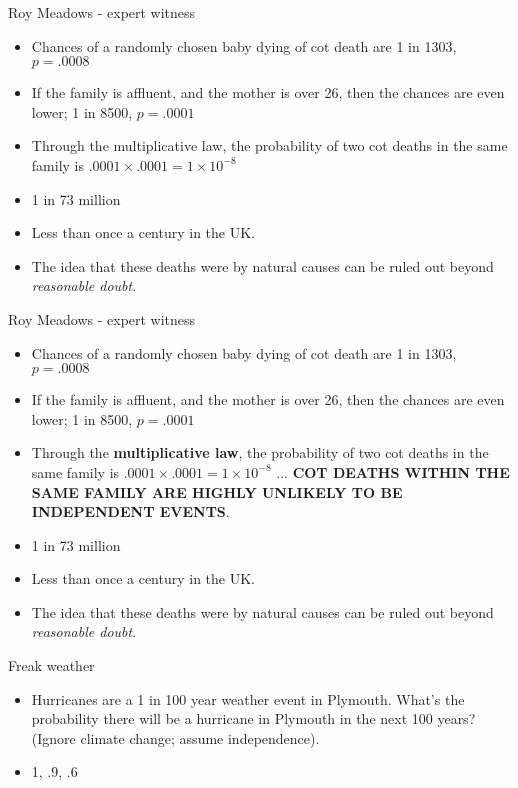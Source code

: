 \documentclass{beamer}
\begin{document}

\begin{frame}{Roy Meadows - expert witness}
\begin{itemize}
\item Chances of a randomly chosen baby dying of cot death are 1 in 1303, $p = .0008$
\item If the family is affluent, and the mother is over 26, then the chances are even lower; 1 in 8500, $p = .0001$
\item Through the multiplicative law, the probability of two cot deaths in the same family is $ .0001 \times .0001 = 1 \times 10^{-8}$
\item 1 in 73 million
\item Less than once a century in the UK.
\item The idea that these deaths were by natural causes can be ruled out beyond \emph{reasonable doubt}.
\end{itemize}
\end{frame}

\begin{frame}{Roy Meadows - expert witness}
\begin{itemize}
\item Chances of a randomly chosen baby dying of cot death are 1 in 1303, $p = .0008$
\item If the family is affluent, and the mother is over 26, then the chances are even lower; 1 in 8500, $p = .0001$
\item Through the \textbf{multiplicative law}, the probability of two cot deaths in the same family is $ .0001 \times .0001 = 1 \times 10^{-8}$ ... \textbf{COT DEATHS WITHIN THE SAME FAMILY ARE HIGHLY UNLIKELY TO BE INDEPENDENT EVENTS}.
\item 1 in 73 million
\item Less than once a century in the UK.
\item The idea that these deaths were by natural causes can be ruled out beyond \emph{reasonable doubt}.
\end{itemize}
\end{frame}

\begin{frame}{Freak weather}
	\begin{itemize} 
		\item Hurricanes are a 1 in 100 year weather event in Plymouth. What's the probability there will be a hurricane in Plymouth in the next 100 years? (Ignore climate change; assume independence).
		\item 1, .9, .6
	\end{itemize}
\end{frame}
\end{document}
